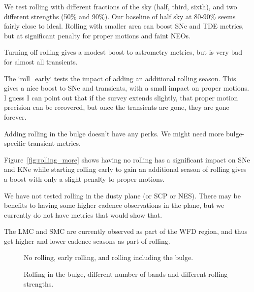 We test rolling with different fractions of the sky (half, third, sixth), and two different strengths (50\% and 90\%). 
Our baseline of half sky at 80-90\% seems fairly close to ideal. Rolling with smaller area can boost SNe and TDE metrics, but at significant penalty for proper motions and faint NEOs.

Turning off rolling gives a modest boost to astrometry metrics, but is very bad for almost all transients. 

The `roll\_early` tests the impact of adding an additional rolling season. This gives a nice boost to SNe and transients, with a small impact on proper motions. I guess I can point out that if the survey extends slightly, that proper motion precision can be recovered, but once the transients are gone, they are gone forever.

Adding rolling in the bulge doesn't have any perks. We might need more bulge-specific transient metrics.


Figure~\ref{fig:rolling_more} shows having no rolling has a significant impact on SNe and KNe while starting rolling early to gain an additional season of rolling gives a boost with only a slight penalty to proper motions. 

We have not tested rolling in the dusty plane (or SCP or NES). There may be benefits to having some higher cadence observations in the plane, but we currently do not have metrics that would show that.

The LMC and SMC are currently observed as part of the WFD region, and thus get higher and lower cadence seasons as part of rolling. 


\begin{figure}
\caption{No rolling, early rolling, and rolling including the bulge.\label{fig:rolling_normal}}
\end{figure}


\begin{figure}
\caption{Rolling in the bulge, different number of bands and different rolling strengths.}
\end{figure}

